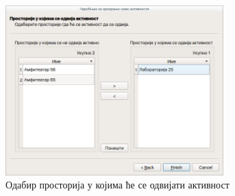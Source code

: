 \documentclass[a4paper, 12pt, diplomski]{etfcyr}
\begin{document}
\begin{justify}
\begin{figure}[H]
\begin{center}
							\includegraphics[width=0.75\textwidth]{manual/activity_wizard_rooms.png}
						\end{center}
						\caption{Одабир просторија у којима ће се одвијати активност}
						\label{figure:activity_rooms}
					\end{figure}
				\end{justify}

		\newpage
\end{document}
